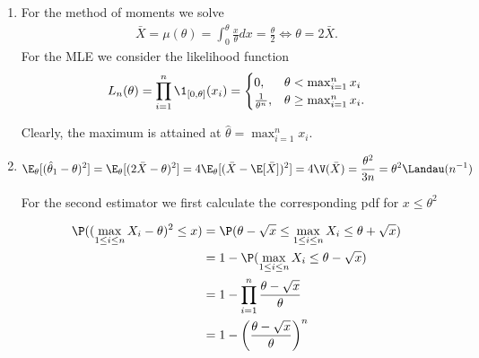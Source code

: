 \begin{solution}

\phantom{}

\begin{enumerate}[label = (\alph*)]
  \item For the method of moments we solve
  \begin{align}
    \bar{X} = \mu(\theta) = \int_0^\theta \frac{x}{\theta} dx = \frac{\theta}{2}
    \iff \theta = 2\bar{X}.
  \end{align}
  For the MLE we consider the likelihood function
  \begin{align*}
    L_n(\theta) = \prod_{i=1}^n \1_{[0, \theta]}(x_i)
    = \begin{cases}
      0, & \theta < \max_{i=1}^n x_i \\
      \frac{1}{\theta^n}, & \theta \geq \max_{i=1}^n x_i.
    \end{cases}
  \end{align*}

  Clearly, the maximum is attained at $\hat{\theta} = \max_{i=1}^n x_i.$

  \item

  \begin{align*}
    \E_\theta[(\hat{\theta}_1 - \theta)^2] = \E_\theta[(2\bar{X} - \theta)^2]
    = 4\E_\theta[(\bar{X} - \E[\bar{X}])^2] = 4\V(\bar{X}) = \frac{\theta^2}{3n}
    = \theta^2 \Landau(n^{-1})
  \end{align*}

  For the second estimator we first calculate the corresponding pdf for $x \leq \theta^2$

  \begin{align*}
    \P((\max_{1 \leq i \leq n} X_i - \theta)^2 \leq x) &=
    \P(\theta - \sqrt{x} \leq \max_{1 \leq i \leq n} X_i \leq \theta + \sqrt{x}) \\
    &= 1 - \P(\max_{1\leq i \leq n} X_i \leq \theta - \sqrt{x}) \\
    &= 1 - \prod_{i=1}^n \frac{\theta - \sqrt{x}}{\theta} \\
    &= 1 - \left(\frac{\theta - \sqrt{x}}{\theta}\right)^n
  \end{align*}


\end{enumerate}
\end{solution}
